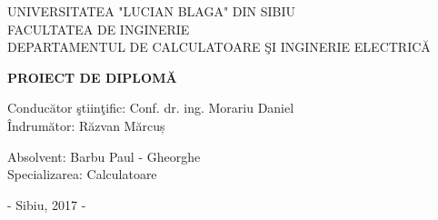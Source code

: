 \documentclass[12pt,a4paper,titlepage]{report}
\author{Barbu Paul - Gheorghe}
\begin{document}
\begin{titlepage}
{
\centering
UNIVERSITATEA "LUCIAN BLAGA" DIN SIBIU\\
FACULTATEA DE INGINERIE \\
DEPARTAMENTUL DE CALCULATOARE ŞI INGINERIE ELECTRICĂ\\
}

\vfill
\vspace{150px}
{
\centering
\begin{center}
\Huge
\textbf{PROIECT DE DIPLOMĂ}
\end{center}

}

\vfill
{
\raggedright
Conducător ştiinţific: Conf. dr. ing. Morariu Daniel \\
Îndrumător: Răzvan Mărcuș
}
\vfill

{
\raggedright
\hspace*{270pt}Absolvent: Barbu Paul - Gheorghe\\
\hspace*{270pt}Specializarea: Calculatoare
}
\vfill

{

\raggedright
\hspace*{270pt}- Sibiu, 2017 -
}
\end{titlepage}
\end{document}
